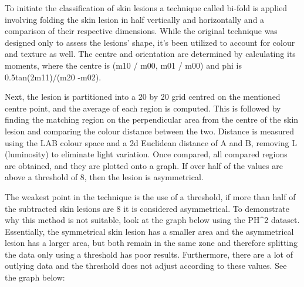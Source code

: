 To initiate the classification of skin lesions a technique called bi-fold is applied involving folding the skin lesion in half vertically and horizontally and a comparison of their respective dimensions. While the original technique was designed only to assess the lesions' shape, it's been utilized to account for colour and texture as well. The centre and orientation are determined by calculating its moments, where the centre is (m10 / m00, m01 / m00) and phi is 0.5tan(2m11)/(m20 -m02). 

Next, the lesion is partitioned into a 20 by 20 grid centred on the mentioned centre point, and the average of each region is computed. This is followed by finding the matching region on the perpendicular area from the centre of the skin lesion and comparing the colour distance between the two. Distance is measured using the LAB colour space and a 2d Euclidean distance of A and B, removing L (luminosity) to eliminate light variation. Once compared, all compared regions are obtained, and they are plotted onto a graph. If over half of the values are above a threshold of 8, then the lesion is asymmetrical.

The weakest point in the technique is the use of a threshold, if more than half of the subtracted skin lesions are 8 it is considered asymmetrical. To demonstrate why this method is not suitable, look at the graph below using the PH^2 dataset. Essentially, the symmetrical skin lesion has a smaller area and the asymmetrical lesion has a larger area, but both remain in the same zone and therefore splitting the data only using a threshold has poor results. Furthermore, there are a lot of outlying data and the threshold does not adjust according to these values. See the graph below:


